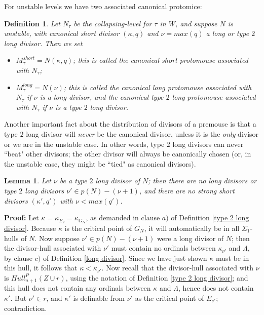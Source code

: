 \documentclass[12pt]{article}
\newtheorem{lem}[thm]{Lemma}
\newtheorem{defn}[thm]{Definition}
\begin{document}
For unstable levels we have two associated canonical protomice:\\

\begin{defn} \label{two associated M's for unstable levels}
Let $N_\tau$ be the collapsing-level for $\tau$ in $W$, and suppose $N$ is unstable, with canonical short divisor $(\kappa , q)$ and $\nu = max (q)$ a long or type $2$ long divisor.  Then we set\\

\begin{itemize}
\item{$M_\tau^{short} = N ( \kappa , q)$; this is called the canonical short protomouse associated with $N_\tau$;}
\item{$M_\tau^{long} = N ( \nu)$; this is called the canonical long protomouse associated with $N_\tau$ if $\nu$ is a long divisor, and the canonical type $2$ long protomouse associated with $N_\tau$ if $\nu$ is a type $2$ long divisor.}
\end{itemize}
\end{defn}

Another important fact about the distribution of divisors of a premouse is that a type $2$ long divisor will \textit{never} be the canonical divisor, unless it is the \textit{only} divisor or we are in the unstable case.  In other words, type $2$ long divisors can never ``beat" other divisors; the other divisor will always be canonically chosen (or, in the unstable case, they might be ``tied" as canonical divisors).\\

\begin{lem} \label{type 2 long never beat other divisors}
Let $\nu$ be a type $2$ long divisor of $N$; then there are no long divisors or type $2$ long divisors $\nu' \in p(N) - ( \nu + 1 )$, and there are no strong short divisors $( \kappa' , q' )$ with $\nu < max( q')$.
\end{lem}

\textbf{Proof:}  Let $\kappa = \kappa_{E_\nu} = \kappa_{G_N}$, as demanded in clause $a)$ of Definition \ref{type 2 long divisor}.  Because $\kappa$ is the critical point of $G_N$, it will automatically be in all $\Sigma_1$-hulls of $N$.  Now suppose $\nu' \in p(N) - ( \nu + 1 )$ were a long divisor of $N$; then the divisor-hull associated with $\nu'$ must contain no ordinals between $\kappa_{\nu'}$ and $\Lambda$, by clause $c)$ of Definition \ref{long divisor}.  Since we have just shown $\kappa$ must be in this hull, it follows that $\kappa < \kappa_{\nu'}$.  Now recall that the divisor-hull associated with $\nu$ is $Hull^P_{n+1} (Z \cup r )$, using the notation of Definition \ref{type 2 long divisor}; and this hull does not contain any ordinals between $\kappa$ and $\Lambda$, hence does not contain $\kappa'$.  But $\nu' \in r$, and $\kappa'$ is definable from $\nu'$ as the critical point of $E_{\nu'}$; contradiction.\\
\end{document}

